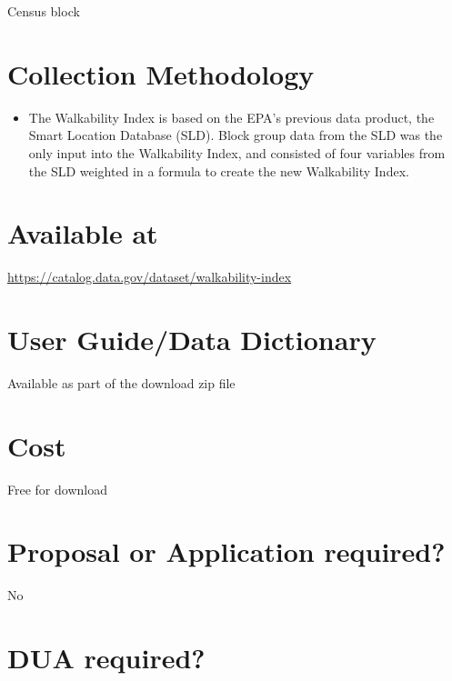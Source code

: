 \documentclass[
]{book}
\providecommand{\tightlist}{%
  \setlength{\itemsep}{0pt}\setlength{\parskip}{0pt}}
\begin{document}
Census block

\hypertarget{collection-methodology-96}{%
\section{Collection Methodology}\label{collection-methodology-96}}

\begin{itemize}
\tightlist
\item
  The Walkability Index is based on the EPA's previous data product, the Smart Location Database (SLD). Block group data from the SLD was the only input into the Walkability Index, and consisted of four variables from the SLD weighted in a formula to create the new Walkability Index.
\end{itemize}

\hypertarget{available-at-96}{%
\section{Available at}\label{available-at-96}}

\url{https://catalog.data.gov/dataset/walkability-index}

\hypertarget{user-guidedata-dictionary-96}{%
\section{User Guide/Data Dictionary}\label{user-guidedata-dictionary-96}}

Available as part of the download zip file

\hypertarget{cost-96}{%
\section{Cost}\label{cost-96}}

Free for download

\hypertarget{proposal-or-application-required-96}{%
\section{Proposal or Application required?}\label{proposal-or-application-required-96}}

No

\hypertarget{dua-required-96}{%
\section{DUA required?}\label{dua-required-96}}
\end{document}
